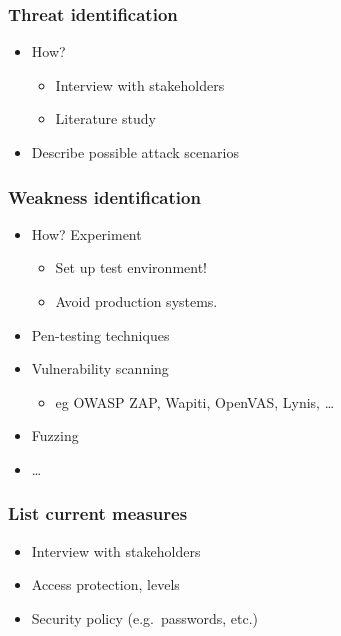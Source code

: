 \documentclass[aspectratio=169]{beamer}
\begin{document}
\begin{frame}
  \frametitle{Threat identification}

  \begin{itemize}
    \item How?
          \begin{itemize}
            \item Interview with stakeholders
            \item Literature study
          \end{itemize}
    \item Describe possible attack scenarios
  \end{itemize}

\end{frame}

\begin{frame}
  \frametitle{Weakness identification}

  \begin{itemize}
    \item How? Experiment
          \begin{itemize}
            \item Set up test environment!
            \item Avoid production systems.
          \end{itemize}
    \item Pen-testing techniques
    \item Vulnerability scanning
          \begin{itemize}
            \item eg OWASP ZAP, Wapiti, OpenVAS, Lynis, \ldots
          \end{itemize}
    \item Fuzzing
    \item \ldots
  \end{itemize}

\end{frame}

\begin{frame}
  \frametitle{List current measures}
  \begin{itemize}
    \item Interview with stakeholders
    \item Access protection, levels
    \item Security policy (e.g.\ passwords, etc.)
  \end{itemize}

\end{frame}
\end{document}
